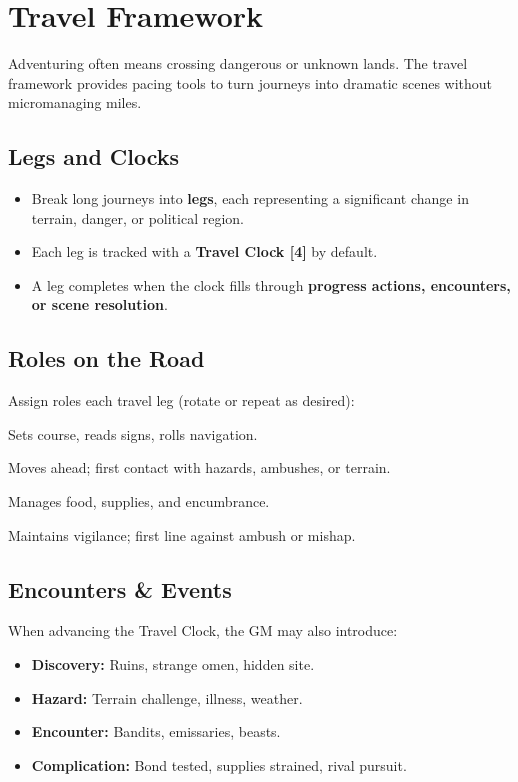 

\section{Travel Framework}
\label{sec:travel}

Adventuring often means crossing dangerous or unknown lands. The travel framework provides pacing tools to turn journeys into dramatic scenes without micromanaging miles.

\subsection{Legs and Clocks}
\begin{itemize}
  \item Break long journeys into \textbf{legs}, each representing a significant change in terrain, danger, or political region.
  \item Each leg is tracked with a \textbf{Travel Clock [4]} by default.
  \item A leg completes when the clock fills through \textbf{progress actions, encounters, or scene resolution}.
\end{itemize}

\subsection{Roles on the Road}
Assign roles each travel leg (rotate or repeat as desired):
\begin{description}[leftmargin=1.5em, style=nextline]
  \item[Guide:] Sets course, reads signs, rolls navigation.
  \item[Scout:] Moves ahead; first contact with hazards, ambushes, or terrain.
  \item[Quartermaster:] Manages food, supplies, and encumbrance.
  \item[Watch:] Maintains vigilance; first line against ambush or mishap.
\end{description}

\subsection{Encounters \& Events}
When advancing the Travel Clock, the GM may also introduce:
\begin{itemize}
  \item \textbf{Discovery:} Ruins, strange omen, hidden site.
  \item \textbf{Hazard:} Terrain challenge, illness, weather.
  \item \textbf{Encounter:} Bandits, emissaries, beasts.
  \item \textbf{Complication:} Bond tested, supplies strained, rival pursuit.
\end{itemize}

